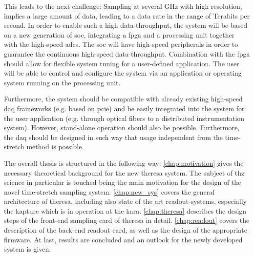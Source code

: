 This leads to the next challenge: Sampling at several \si{\GHz} with high resolution, implies a large amount of data, leading to a data rate in the range of Terabits per second.
In order to enable such a high data-throughput, the system will be based on a new generation of \gls{soc}, integrating a \gls{fpga} and a processing unit together with the high-speed \glspl{adc}. 
The \gls{soc} will have high-speed peripherals in order to guarantee the continuous high-speed data-throughput. 
Combination with the \gls{fpga} should allow for flexible system tuning for a user-defined application.
The user will be able to control and configure the system via an application or operating system running on the processing unit.

Furthermore, the system should be compatible with already existing high-speed \gls{daq} frameworks (e.g. based on \gls{pcie}) and be easily integrated into the system for the user application (e.g. through optical fibers to a distributed instrumentation system). 
However, stand-alone operation should also be possible.
Furthermore, the \gls{daq} should be designed in such way that usage independent from the time-stretch method is possible.

The overall thesis is structured in the following way: 
\autoref{chap:motivation} gives the necessary theoretical background for the new \gls{theresa} system. 
The subject of \gls{thz} science in particular is touched being the main motivation for the design of the novel time-stretch sampling system.
\autoref{chap:new_sys} covers the general architecture of \gls{theresa}, including also state of the art readout-systems, especially the \gls{kapture} which is in operation at the \gls{kara}.
\autoref{chap:theresa} describes the design steps of the front-end sampling card of \gls{theresa} in detail.
\autoref{chap:readout} covers the description of the back-end readout card, as well as the design of the appropriate firmware.
At last, results are concluded and an outlook for the newly developed system is given.

\glsresetall